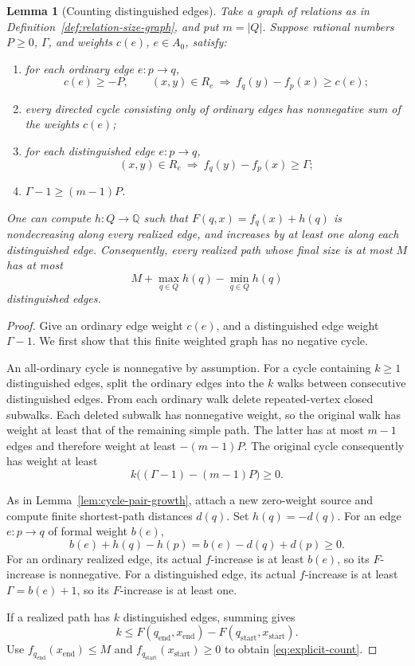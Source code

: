 \documentclass[11pt,a4paper]{article}
\newtheorem{lemma}[theorem]{Lemma}
\theoremstyle{definition}
\theoremstyle{remark}
\begin{document}
\begin{lemma}[Counting distinguished edges]\label{lem:relation-count}
Take a graph of relations as in Definition~\ref{def:relation-size-graph},
and put \(m=|Q|\). Suppose rational numbers \(P\ge0\), \(\Gamma\),
and weights \(c(e)\), \(e\in A_0\), satisfy:
\begin{enumerate}
\item for each ordinary edge \(e:p\to q\),
\[
 c(e)\ge-P,\qquad
 (x,y)\in R_e\ \Longrightarrow\
       f_q(y)-f_p(x)\ge c(e);
\]
\item every directed cycle consisting only of ordinary edges has
      nonnegative sum of the weights \(c(e)\);
\item for each distinguished edge \(e:p\to q\),
\[
 (x,y)\in R_e\ \Longrightarrow\
       f_q(y)-f_p(x)\ge\Gamma;
\]
\item \(\Gamma-1\ge(m-1)P\).
\end{enumerate}
One can compute \(h:Q\to\mathbb Q\) such that
\(F(q,x)=f_q(x)+h(q)\) is nondecreasing along every realized edge,
and increases by at least one along each distinguished edge.
Consequently, every realized path whose final size is at most \(M\)
has at most
\begin{equation}
 M+\max_{q\in Q}h(q)-\min_{q\in Q}h(q)
 \label{eq:explicit-count}
\end{equation}
distinguished edges.
\end{lemma}
\begin{proof}
Give an ordinary edge weight \(c(e)\), and a distinguished edge
weight \(\Gamma-1\). We first show that this finite weighted graph
has no negative cycle.

An all-ordinary cycle is nonnegative by assumption.
For a cycle containing \(k\ge1\) distinguished edges, split the
ordinary edges into the \(k\) walks between consecutive distinguished
edges. From each ordinary walk delete repeated-vertex closed
subwalks. Each deleted subwalk has nonnegative weight, so the
original walk has weight at least that of the remaining simple path.
The latter has at most \(m-1\) edges and therefore weight at least
\(-(m-1)P\). The original cycle consequently has weight at least
\[
 k\bigl((\Gamma-1)-(m-1)P\bigr)\ge0.
\]

As in Lemma~\ref{lem:cycle-pair-growth}, attach a new zero-weight source
and compute finite shortest-path distances \(d(q)\).
Set \(h(q)=-d(q)\). For an edge \(e:p\to q\) of formal weight \(b(e)\),
\[
 b(e)+h(q)-h(p)
   =b(e)-d(q)+d(p)\ge0.
\]
For an ordinary realized edge, its actual \(f\)-increase is at least
\(b(e)\), so its \(F\)-increase is nonnegative. For a distinguished
edge, its actual \(f\)-increase is at least \(\Gamma=b(e)+1\), so its
\(F\)-increase is at least one.

If a realized path has \(k\) distinguished edges, summing gives
\[
 k\le F(q_{\mathrm{end}},x_{\mathrm{end}})
       -F(q_{\mathrm{start}},x_{\mathrm{start}}).
\]
Use \(f_{q_{\mathrm{end}}}(x_{\mathrm{end}})\le M\) and
\(f_{q_{\mathrm{start}}}(x_{\mathrm{start}})\ge0\) to obtain
\eqref{eq:explicit-count}.
\end{proof}
\end{document}

